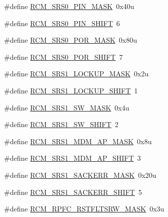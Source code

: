 \begin{DoxyCompactItemize}
\item 
\#define \hyperlink{group___r_c_m___register___masks_gab94707d2e91618c8c803dfa2d8df4e7b}{R\+C\+M\+\_\+\+S\+R\+S0\+\_\+\+P\+I\+N\+\_\+\+M\+A\+SK}~0x40u
\item 
\#define \hyperlink{group___r_c_m___register___masks_ga1c1ae6946300c9f33bf5575d45d2b862}{R\+C\+M\+\_\+\+S\+R\+S0\+\_\+\+P\+I\+N\+\_\+\+S\+H\+I\+FT}~6
\item 
\#define \hyperlink{group___r_c_m___register___masks_gad172e7645b5b6a0c5a2ff91db3087f7e}{R\+C\+M\+\_\+\+S\+R\+S0\+\_\+\+P\+O\+R\+\_\+\+M\+A\+SK}~0x80u
\item 
\#define \hyperlink{group___r_c_m___register___masks_ga98b995f8d56d338b315d6750072474ff}{R\+C\+M\+\_\+\+S\+R\+S0\+\_\+\+P\+O\+R\+\_\+\+S\+H\+I\+FT}~7
\item 
\#define \hyperlink{group___r_c_m___register___masks_ga4f7c4ce64c13c55fc0c7aaea3a702a03}{R\+C\+M\+\_\+\+S\+R\+S1\+\_\+\+L\+O\+C\+K\+U\+P\+\_\+\+M\+A\+SK}~0x2u
\item 
\#define \hyperlink{group___r_c_m___register___masks_ga71f857503a2b2d2e0c30d4762e89a8d8}{R\+C\+M\+\_\+\+S\+R\+S1\+\_\+\+L\+O\+C\+K\+U\+P\+\_\+\+S\+H\+I\+FT}~1
\item 
\#define \hyperlink{group___r_c_m___register___masks_ga72f541acd2a0992ad0d1d089c694ad5f}{R\+C\+M\+\_\+\+S\+R\+S1\+\_\+\+S\+W\+\_\+\+M\+A\+SK}~0x4u
\item 
\#define \hyperlink{group___r_c_m___register___masks_ga7e554c1ae96dae684fbc81204283f86c}{R\+C\+M\+\_\+\+S\+R\+S1\+\_\+\+S\+W\+\_\+\+S\+H\+I\+FT}~2
\item 
\#define \hyperlink{group___r_c_m___register___masks_ga6af4d8ed2135b602de575373f22b1af8}{R\+C\+M\+\_\+\+S\+R\+S1\+\_\+\+M\+D\+M\+\_\+\+A\+P\+\_\+\+M\+A\+SK}~0x8u
\item 
\#define \hyperlink{group___r_c_m___register___masks_ga91611da7546b27a939e92926f378229f}{R\+C\+M\+\_\+\+S\+R\+S1\+\_\+\+M\+D\+M\+\_\+\+A\+P\+\_\+\+S\+H\+I\+FT}~3
\item 
\#define \hyperlink{group___r_c_m___register___masks_gaa09459c8ed6200a5828221f9d15656d3}{R\+C\+M\+\_\+\+S\+R\+S1\+\_\+\+S\+A\+C\+K\+E\+R\+R\+\_\+\+M\+A\+SK}~0x20u
\item 
\#define \hyperlink{group___r_c_m___register___masks_gab30a0b3f954edb8a480649686bd208fb}{R\+C\+M\+\_\+\+S\+R\+S1\+\_\+\+S\+A\+C\+K\+E\+R\+R\+\_\+\+S\+H\+I\+FT}~5
\item 
\#define \hyperlink{group___r_c_m___register___masks_ga36e0fc448dc94b90314dd6dd2dd41763}{R\+C\+M\+\_\+\+R\+P\+F\+C\+\_\+\+R\+S\+T\+F\+L\+T\+S\+R\+W\+\_\+\+M\+A\+SK}~0x3u

\end{DoxyCompactItemize}
